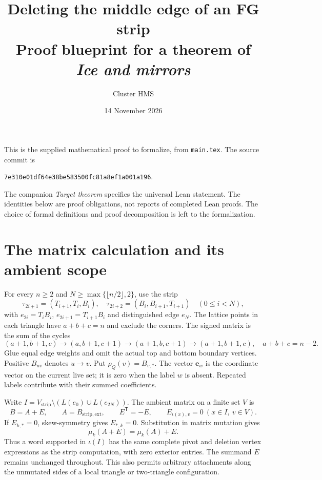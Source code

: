 \documentclass[11pt,a4paper]{article}
\title{Deleting the middle edge of an FG strip\\\large Proof blueprint for a theorem of \emph{Ice and mirrors}}
\author{Cluster HMS}
\date{14 November 2026}
\newcommand{\e}{\mathbf e}
\newcommand{\strip}{\mathrm{strip}}
\begin{document}
\maketitle
\vspace{-1.5em}
This is the supplied mathematical proof to formalize, from \texttt{main.tex}.
The source commit is
\begin{center}\texttt{7e310e01df64e38be583500fc81a8ef1a001a196}.\end{center}
The companion \emph{Target theorem} specifies the universal Lean statement.
The identities below are proof obligations, not reports of completed Lean proofs.
The choice of formal definitions and proof decomposition is left to the formalization.

\section{The matrix calculation and its ambient scope}
For every $n\ge2$ and $N\ge\max\{\lfloor n/2\rfloor,2\}$, use the strip
\[
 \tau_{2i+1}=(T_{i+1},T_i,B_i),\quad
 \tau_{2i+2}=(B_i,B_{i+1},T_{i+1})\quad(0\le i<N),
\]
with $e_{2i}=T_iB_i$, $e_{2i+1}=T_{i+1}B_i$ and distinguished edge $e_N$.
The lattice points in each triangle have $a+b+c=n$ and exclude the corners.
The signed matrix is the sum of the cycles
\begin{equation}\label{eq:cycles}
 (a+1,b+1,c)\longrightarrow(a,b+1,c+1)
 \longrightarrow(a+1,b,c+1)\longrightarrow(a+1,b+1,c),
 \quad a+b+c=n-2.
\end{equation}
Glue equal edge weights and omit the actual top and bottom boundary vertices.
Positive $B_{uv}$ denotes $u\to v$. Put $\rho_Q(v)=B_{v,*}$.
The vector $\e_w$ is the coordinate vector on the current live set;
it is zero when the label $w$ is absent. Repeated labels contribute with
their summed coefficients.

Write $I=V_{\strip}\setminus(L(e_0)\cup L(e_{2N}))$.
The ambient matrix on a finite set $V$ is
\[
 B=A+E,\qquad A=B_{\strip,\mathrm{ext}},\qquad
 E^\mathsf{T}=-E,\qquad E_{\iota(x),v}=0\ (x\in I,\ v\in V).
\]
If $E_{k,*}=0$, skew-symmetry gives $E_{*,k}=0$. Substitution in matrix mutation gives
\begin{equation}\label{eq:ambient-mutation}
 \mu_k(A+E)=\mu_k(A)+E.
\end{equation}
Thus a word supported in $\iota(I)$ has the same complete pivot and deletion
vertex expressions as the strip computation, with zero exterior entries.
The summand $E$ remains unchanged throughout.
This also permits arbitrary attachments along the unmutated sides of a
local triangle or two-triangle configuration.
\end{document}
